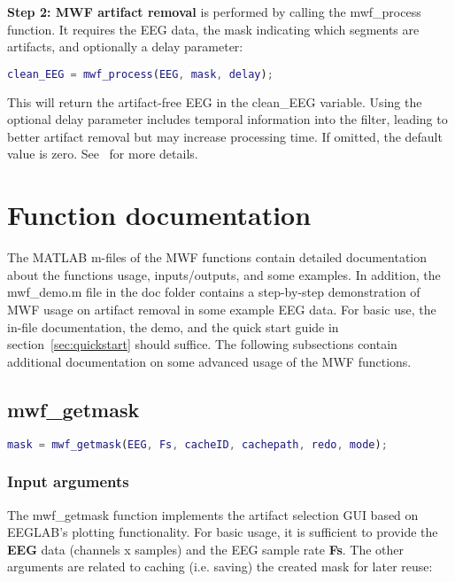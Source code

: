 \documentclass[11pt]{article}
\begin{document}
\textbf{Step 2: MWF artifact removal} is performed by calling the mwf\_process function. It requires the EEG data, the mask indicating which segments are artifacts, and optionally a delay parameter:

\begin{lstlisting}[frame=single, language=matlab]
    clean_EEG = mwf_process(EEG, mask, delay);
\end{lstlisting}

This will return the artifact-free EEG in the clean\_EEG variable. Using the optional delay parameter includes temporal information into the filter, leading to better artifact removal but may increase processing time. If omitted, the default value is zero. See~\cite{somers2018generic} for more details.

\section{Function documentation}

The MATLAB m-files of the MWF functions contain detailed documentation about the functions usage, inputs/outputs, and some examples. In addition, the mwf\_demo.m file in the doc folder contains a step-by-step demonstration of MWF usage on artifact removal in some example EEG data. For basic use, the in-file documentation, the demo, and the quick start guide in section~\ref{sec:quickstart} should suffice. The following subsections contain additional documentation on some advanced usage of the MWF functions.

\subsection{mwf\_getmask}

\begin{lstlisting}[frame=single, language=matlab]
mask = mwf_getmask(EEG, Fs, cacheID, cachepath, redo, mode);
\end{lstlisting}

\subsubsection{Input arguments}

The mwf\_getmask function implements the artifact selection GUI based on EEGLAB's plotting functionality. For basic usage, it is sufficient to provide the \textbf{EEG} data (channels x samples) and the EEG sample rate \textbf{Fs}. The other arguments are related to caching (i.e. saving) the created mask for later reuse:
\end{document}
